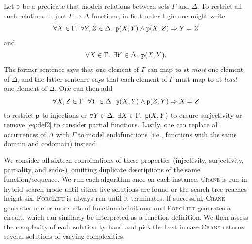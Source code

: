 \documentclass{article}
\newcommand{\predicate}{\texttt{\textup{p}}}
\begin{document}
Let $\predicate$ be a predicate that models relations between sets $\Gamma$ and
$\Delta$. To restrict all such relations to just $\Gamma \to \Delta$ functions,
in first-order logic one might write
\[
  \forall X \in \Gamma\text{. }\forall Y,Z \in \Delta\text{. }\predicate(X, Y) \land \predicate(X, Z) \Rightarrow Y = Z
\]
and
\begin{equation}\label{eq:def2}
  \forall X \in \Gamma\text{. }\exists Y \in \Delta\text{. }\predicate(X, Y).
\end{equation}
The former sentence says that one element of $\Gamma$ can map to at \emph{most}
one element of $\Delta$, and the latter sentence says that each element of
$\Gamma$ must map to at \emph{least} one element of $\Delta$. One can then add
\[
  \forall X,Z \in \Gamma\text{. }\forall Y \in \Delta\text{. }\predicate(X, Y) \land \predicate(Z, Y) \Rightarrow X = Z
\]
to restrict $\predicate$ to injections or
  $\forall Y \in \Delta\text{. }\exists X \in \Gamma\text{. }\predicate(X, Y)$
to ensure surjectivity or remove \cref{eq:def2} to consider partial functions.
Lastly, one can replace all occurrences of $\Delta$ with $\Gamma$ to model
endofunctions (i.e., functions with the same domain and codomain) instead.

We consider all sixteen combinations of these properties (injectivity,
surjectivity, partiality, and endo-), omitting duplicate descriptions of the
same function/sequence. We run each algorithm once on each instance.
\textsc{Crane} is run in hybrid search mode until either five solutions are
found or the search tree reaches height six. \textsc{ForcLift} is always run
until it terminates. If successful, \textsc{Crane} generates one or more sets of
function definitions, and \textsc{ForcLift} generates a circuit, which can
similarly be interpreted as a function definition. We then assess the complexity
of each solution by hand and pick the best in case \textsc{Crane} returns
several solutions of varying complexities.


\end{document}
